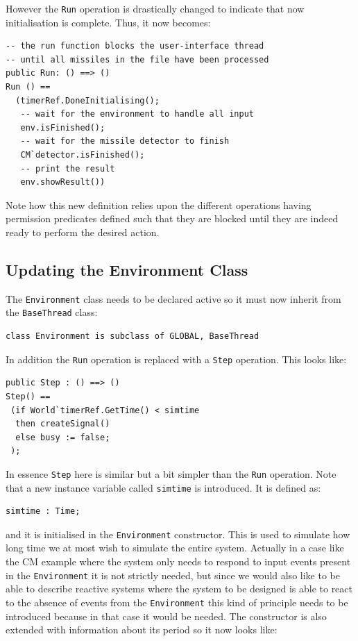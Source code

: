 \documentclass{overturerepchap}
\begin{document}

However the \texttt{Run} operation is drastically changed to indicate that now initialisation is complete. Thus, it now becomes:

\begin{lstlisting}
-- the run function blocks the user-interface thread
-- until all missiles in the file have been processed
public Run: () ==> ()
Run () == 
  (timerRef.DoneInitialising();
   -- wait for the environment to handle all input
   env.isFinished();
   -- wait for the missile detector to finish
   CM`detector.isFinished();
   -- print the result
   env.showResult())
\end{lstlisting}

Note how this new definition relies upon the different operations
having permission predicates defined such that they are blocked until
they are indeed ready to perform the desired action.

\subsection{Updating the Environment Class}

The \texttt{Environment} class needs to be declared active so it must 
now inherit from the \texttt{BaseThread} class:

\begin{lstlisting}
class Environment is subclass of GLOBAL, BaseThread
\end{lstlisting}

In addition the \texttt{Run} operation is
replaced with a \texttt{Step} operation. This looks like:

\begin{lstlisting}
public Step : () ==> ()
Step() ==
 (if World`timerRef.GetTime() < simtime
  then createSignal()
  else busy := false;
 );
\end{lstlisting}

In essence \texttt{Step} here is similar but a bit simpler than the
\texttt{Run} operation. Note that a
new instance variable called \texttt{simtime} is introduced. It is
defined as:

\begin{lstlisting}
simtime : Time;
\end{lstlisting}
and it is initialised in the \texttt{Environment} constructor. This
is used to simulate how long time we at most wish to simulate the
entire system. Actually in a case like the CM example where the system
only needs to respond to input events present in the
\texttt{Environment} it is not strictly needed, but since we would
also like to be able to describe reactive systems where the system to
be designed is able to react to the absence of events from the
\texttt{Environment} this kind of principle needs to be introduced
because in that case it would be needed. The constructor is also extended 
with information about its period so it now looks like:
\end{document}
